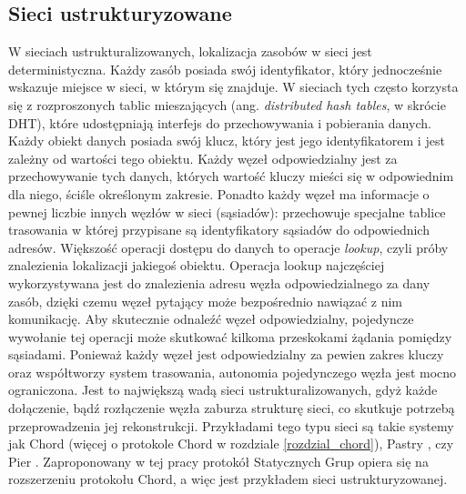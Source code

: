 \documentclass[12pt, twoside, openany]{report}
\begin{document}
\subsection{Sieci ustrukturyzowane}
W sieciach ustrukturalizowanych, lokalizacja zasobów w sieci jest deterministyczna. Każdy zasób posiada swój identyfikator, który jednocześnie wskazuje miejsce w sieci, w którym się znajduje. W sieciach tych często korzysta się z rozproszonych tablic mieszających (ang. \textit{distributed hash tables}, w skrócie DHT), które udostępniają interfejs do przechowywania i pobierania danych. Każdy obiekt danych posiada swój klucz, który jest jego identyfikatorem i jest zależny od wartości tego obiektu. Każdy węzeł odpowiedzialny jest za przechowywanie tych danych, których wartość kluczy mieści się w odpowiednim dla niego, ściśle określonym zakresie. Ponadto każdy węzeł ma informacje o pewnej liczbie innych węzłów w sieci (sąsiadów): przechowuje specjalne tablice trasowania w której przypisane są identyfikatory sąsiadów do odpowiednich adresów. Większość operacji dostępu do danych to operacje \textit{lookup}, czyli próby znalezienia lokalizacji jakiegoś obiektu. Operacja lookup najczęściej wykorzystywana jest do znalezienia adresu węzła odpowiedzialnego za dany zasób, dzięki czemu węzeł pytający może bezpośrednio nawiązać z nim komunikację. Aby skutecznie odnaleźć węzeł odpowiedzialny, pojedyncze wywołanie tej operacji może skutkować kilkoma przeskokami żądania pomiędzy sąsiadami. Ponieważ każdy węzeł jest odpowiedzialny za pewien zakres kluczy oraz współtworzy system trasowania, autonomia pojedynczego węzła jest mocno ograniczona. Jest to największą wadą sieci ustrukturalizowanych, gdyż każde dołączenie, bądź rozłączenie węzła zaburza strukturę sieci, co skutkuje potrzebą przeprowadzenia jej rekonstrukcji. Przykładami tego typu sieci są takie systemy jak Chord (więcej o protokole Chord w rozdziale \ref{rozdzial_chord}), Pastry \cite{bib:pastry}, czy Pier \cite{bib:pier}. Zaproponowany w tej pracy protokół Statycznych Grup opiera się na rozszerzeniu protokołu Chord, a więc jest przykładem sieci ustrukturyzowanej.
\end{document}
